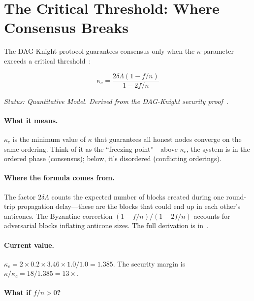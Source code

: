 \documentclass[11pt,a4paper]{article}
\begin{document}
\section{The Critical Threshold: Where Consensus Breaks}

The DAG-Knight protocol guarantees consensus only when the $\kappa$-parameter exceeds a critical threshold~\cite{dagknight,phantom}:

\begin{equation}
\boxed{\kappa_c = \frac{2\delta\Lambda(1-f/n)}{1-2f/n}}
\end{equation}

\emph{Status: \textcolor{hardcoded}{Quantitative Model}. Derived from the DAG-Knight security proof~\cite{dagknight}.}

\paragraph{What it means.} $\kappa_c$ is the minimum value of $\kappa$ that guarantees all honest nodes converge on the same ordering. Think of it as the ``freezing point''---above $\kappa_c$, the system is in the ordered phase (consensus); below, it's disordered (conflicting orderings).

\paragraph{Where the formula comes from.} The factor $2\delta\Lambda$ counts the expected number of blocks created during one round-trip propagation delay---these are the blocks that could end up in each other's anticones. The Byzantine correction $(1-f/n)/(1-2f/n)$ accounts for adversarial blocks inflating anticone sizes. The full derivation is in~\cite{dagknight}.

\paragraph{Current value.} $\kappa_c = 2 \times 0.2 \times 3.46 \times 1.0 / 1.0 = 1.385$. The security margin is $\kappa/\kappa_c = 18/1.385 = 13\times$.

\paragraph{What if $f/n > 0$?}
\end{document}
